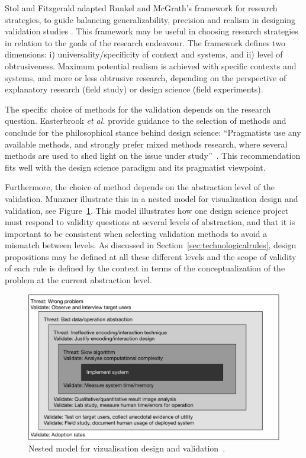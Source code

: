 \documentclass[graybox]{svmult}
\begin{document}
Stol and Fitzgerald adapted Runkel and McGrath's framework for research strategies, to guide balancing generalizability, precision and realism in designing validation studies \cite{StolABC18}. This framework may be useful in choosing research strategies in relation to the goals of the research endeavour. The framework defines two dimensions: i) universality/specificity of context and systems, and ii) level of obtrusiveness. Maximum potential realism is achieved with specific contexts and systems, and more or less obtrusive research, depending on the perspective of explanatory research (field study) or design science (field experiments).  

The specific choice of methods for the validation depends on the research question. Easterbrook \emph{et al.} provide guidance to the selection of methods and conclude for the philosophical stance behind design science: ``Pragmatists use any available methods, and strongly prefer mixed methods research, where several methods are used to shed light on the issue under study''~\cite{easterbrook_selecting_2008}. 
This recommendation fits well with the design science paradigm and its pragmatist viewpoint.

Furthermore, the choice of method depends on the abstraction level of the validation. Munzner illustrate this in a nested model for visualization design and validation, see Figure~\ref{fig:nested_model}. This model illustrates how one design science project must respond to validity questions at several levels of abstraction, and that it is important to be consistent when selecting validation methods to avoid a mismatch between levels. As discussed in Section~\ref{sec:technologicalrules}, design propositions may be defined at all these different levels and the scope of validity of each rule is defined by the context in terms of the conceptualization of the problem at the current abstraction level.

\begin{figure}[t]
  \includegraphics[width=\textwidth]{Figures/nested_model.pdf}
\caption{Nested model for vizualisation design and validation~\cite{munzner2009}.}
\label{fig:nested_model}       %
\end{figure} 
\end{document}
